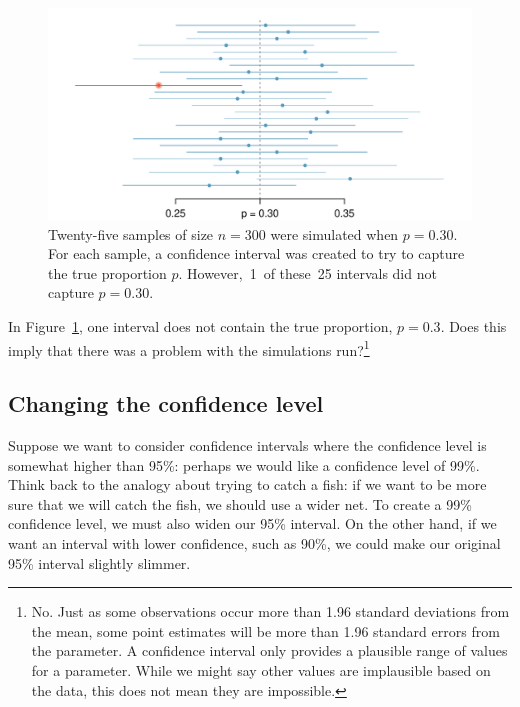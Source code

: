 \begin{figure}[hht]
   \centering
   \includegraphics[width=\textwidth]{02/figures/95PercentConfidenceInterval/95PercentConfidenceInterval}
   \caption{Twenty-five samples of size $n=300$ were simulated when $p = 0.30$. For each sample, a confidence interval was created to try to capture the true proportion $p$. However,~1~of these~25 intervals did not capture $p = 0.30$.}
   \label{95PercentConfidenceInterval}
\end{figure}

\begin{exercise}
In Figure~\ref{95PercentConfidenceInterval}, one interval does not contain the true proportion, $p = 0.3$. Does this imply that there was a problem with the simulations run?\footnote{No. Just as some observations occur more than 1.96 standard deviations from the mean, some point estimates will be more than 1.96 standard errors from the parameter. A confidence interval only provides a plausible range of values for a parameter. While we might say other values are implausible based on the data, this does not mean they are impossible.}
\end{exercise}


\subsection{Changing the confidence level}
\label{changingTheConfidenceLevelSection}



Suppose we want to consider confidence intervals where the confidence level is somewhat higher than 95\%: perhaps we would like a confidence level of 99\%. Think back to the analogy about trying to catch a fish: if we want to be more sure that we will catch the fish, we should use a wider net. To create a 99\% confidence level, we must also widen our 95\% interval. On the other hand, if we want an interval with lower confidence, such as 90\%, we could make our original 95\% interval slightly slimmer.

